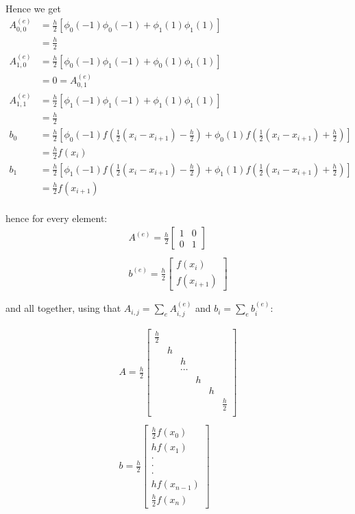 \documentclass[a4paper,10pt]{article}
\begin{document}
Hence we get
\begin{align*}
 A_{0,0}^{(e)} &= \frac{h}{2} [ \phi_0(-1) \phi_0(-1) + \phi_1(1) \phi_1(1) ] \\
 &= \frac{h}{2} \\
 A_{1,0}^{(e)} &= \frac{h}{2} [ \phi_0(-1) \phi_1(-1) + \phi_0(1) \phi_1(1) ] \\
 &= 0 = A_{0,1}^{(e)} \\
 A_{1,1}^{(e)} &= \frac{h}{2} [ \phi_1(-1) \phi_1(-1) + \phi_1(1) \phi_1(1) ] \\
 &= \frac{h}{2} \\
 b_0 &= \frac{h}{2} [ \phi_0(-1) f( \frac{1}{2} (x_i - x_{i+1}) - \frac{h}{2}) + \phi_0(1) f(\frac{1}{2} (x_i - x_{i+1}) + \frac{h}{2} ) ] \\
 &= \frac{h}{2} f(x_i) \\
 b_1 &= \frac{h}{2} [ \phi_1(-1) f( \frac{1}{2} (x_i - x_{i+1}) - \frac{h}{2}) + \phi_1(1) f(\frac{1}{2} (x_i - x_{i+1}) + \frac{h}{2} ) ] \\
 &= \frac{h}{2} f(x_{i+1}) \\
 \end{align*}

hence for every element:
 \begin{align*}
 A^{(e)} = \frac{h}{2} \begin{bmatrix} 1 & 0 \\ 0 & 1 \end{bmatrix} \\
 \\
 b^{(e)} = \frac{h}{2} \begin{bmatrix} f(x_i) \\ f(x_{i+1}) \end{bmatrix} \\
 \\
 \end{align*}
and all together, using that \newline
$A_{i,j} = \sum_e A_{i,j}^{(e)}$ and $b_i = \sum_e b_i^{(e)}$:

 \begin{align*}
 A = \frac{h}{2} 
 \begin{bmatrix}
 \frac{h}{2}\\ 
 & h\\
 & & h\\
 & & \cdots\\
 & & & h\\
 & & & & h\\
 & & & & & \frac{h}{2} \\
 \end{bmatrix} \\
\\
b = \frac{h}{2} 
 \begin{bmatrix}
 \frac{h}{2} f(x_0) \\ 
 h f(x_1) \\
 \cdot \\ \cdot \\ \cdot \\ 
 h f(x_{n-1}) \\ 
 \frac{h}{2} f(x_n) 
 \end{bmatrix} \\
\end{align*}
\end{document}
